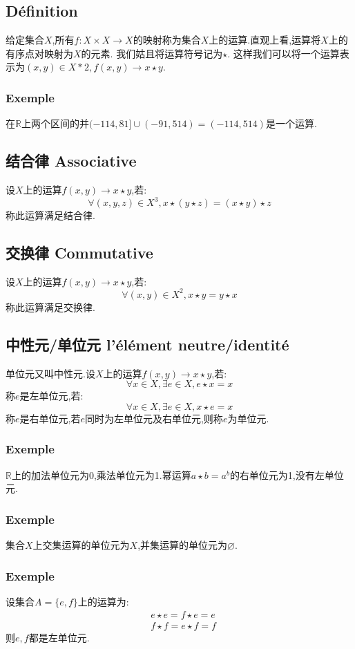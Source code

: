 \documentclass[12pt, a4paper, oneside]{ctexbook}
\begin{document}
  \subsection{Définition}
  给定集合$X$,所有$f:X\times X\rightarrow X$的映射称为集合$X$上的运算.直观上看,运算将$X$上的有序点对映射为$X$的元素.
  我们姑且将运算符号记为$\star $.
  这样我们可以将一个运算表示为$(x,y)\in X*2,f(x,y)\rightarrow x\star y$.
  \subsubsection{Exemple}
  在$\mathbb{R}$上两个区间的并$(-114,81]\cup (-91,514)=(-114,514)$是一个运算.
  \subsection{结合律 Associative}
  设$X$上的运算$f(x,y)\rightarrow x\star y $,若:
  $$
  \forall (x,y,z)\in X^3, x\star(y\star z)=(x\star y)\star z
  $$
  称此运算满足结合律.
  \subsection{交换律 Commutative}
  设$X$上的运算$f(x,y)\rightarrow x\star y $,若:
  $$
  \forall (x,y)\in X^2, x\star y=y\star x
  $$
  称此运算满足交换律.
  \subsection{中性元/单位元 l'élément neutre/identité}
  单位元又叫中性元.设$X$上的运算$f(x,y)\rightarrow x\star y $,若:
  $$
  \forall x\in X, \exists e\in X,e\star x=x
  $$
  称$e$是左单位元,若:
  $$
  \forall x\in X, \exists e\in X,x\star e=x
  $$
  称$e$是右单位元,若$e$同时为左单位元及右单位元,则称$e$为单位元.
  \subsubsection{Exemple}
  $\mathbb{R} $上的加法单位元为0,乘法单位元为1.幂运算$a\star b=a^b$的右单位元为1,没有左单位元.
  \subsubsection{Exemple}
  集合$X$上交集运算的单位元为$X$,并集运算的单位元为$\varnothing $.
  \subsubsection{Exemple}
  设集合$A=\{e,f\}$上的运算为:
  $$
    \begin{aligned}&
    e\star e=f\star e=e\\&
    f\star f=e\star f=f
  \end{aligned}
  $$则$e,f$都是左单位元.
\end{document}
